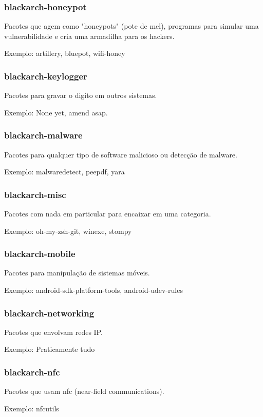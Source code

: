 \documentclass[a4paper, oneside, 11pt]{book}
\begin{document}
\subsubsection{blackarch-honeypot}
Pacotes que agem como "honeypots" (pote de mel), programas para simular uma vulnerabilidade e cria uma armadilha para os hackers.

Exemplo: artillery, bluepot, wifi-honey

\subsubsection{blackarch-keylogger}
Pacotes para gravar o digito em outros sistemas.

Exemplo: None yet, amend asap.

\subsubsection{blackarch-malware}
Pacotes para qualquer tipo de software malicioso ou detecção de
malware.

Exemplo: malwaredetect, peepdf, yara

\subsubsection{blackarch-misc}
Pacotes com nada em particular para encaixar em uma categoria.

Exemplo: oh-my-zsh-git, winexe, stompy

\subsubsection{blackarch-mobile}
Pacotes para manipulação de sistemas móveis.

Exemplo: android-sdk-platform-tools, android-udev-rules

\subsubsection{blackarch-networking}
Pacotes que envolvam redes IP.

Exemplo: Praticamente tudo

\subsubsection{blackarch-nfc}
Pacotes que usam nfc (near-field communications).

Exemplo: nfcutils
\end{document}
